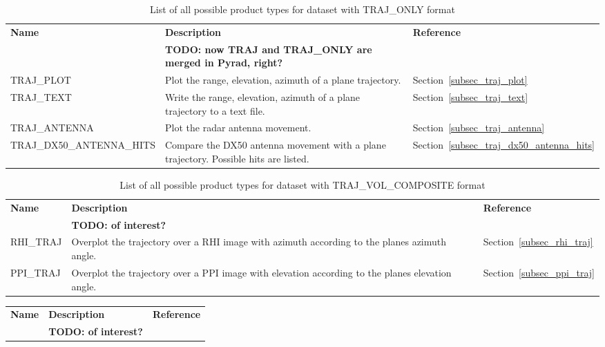 \documentclass[a4paper,11pt,pdftex,twoside]{scrartcl}
\renewcommand{\bf}{\normalfont \bfseries}
\begin{document}
{{{\begin{table}[H]
\begin{tabularx}{\textwidth}{lXl}
{\bf Name} & {\bf Description} & {\bf Reference}\\
& {\bf TODO: now TRAJ and TRAJ\_ONLY are merged in Pyrad, right?} & \\
TRAJ\_PLOT    & Plot the range, elevation, azimuth of a plane
                trajectory.                            & Section~\ref{subsec_traj_plot}\\
TRAJ\_TEXT    & Write the range, elevation, azimuth of a plane
                trajectory to a text file.             & Section~\ref{subsec_traj_text}\\
TRAJ\_ANTENNA & Plot the radar antenna movement.       & Section~\ref{subsec_traj_antenna}\\
TRAJ\_DX50\_ANTENNA\_HITS & Compare the DX50 antenna movement
                with a plane trajectory. Possible hits are
                listed.                                & Section~\ref{subsec_traj_dx50_antenna_hits}\\
\end{tabularx}
\caption{List of all possible product types for dataset with TRAJ\_ONLY format}
\label{tab_products_TRAJ_ONLY}
\end{table}

\begin{table}[H]
\begin{tabularx}{\textwidth}{lXl}
{\bf Name} & {\bf Description} & {\bf Reference}\\
& {\bf TODO: of interest?} & \\

RHI\_TRAJ     & Overplot the trajectory over a RHI image
                with azimuth according to the planes
                azimuth angle.                         & Section~\ref{subsec_rhi_traj}\\
PPI\_TRAJ     & Overplot the trajectory over a PPI image
                with elevation according to the planes
                elevation angle.                       & Section~\ref{subsec_ppi_traj}\\
\end{tabularx}
\caption{List of all possible product types for dataset with TRAJ\_VOL\_COMPOSITE format}
\label{tab_products_TRAJ_VOL_COMPOSITE}
\end{table}

\begin{table}[H]
\begin{tabularx}{\textwidth}{lXl}
{\bf Name} & {\bf Description} & {\bf Reference}\\
& {\bf TODO: of interest?} & \\


\end{tabularx}
\end{table}}}}
\end{document}
